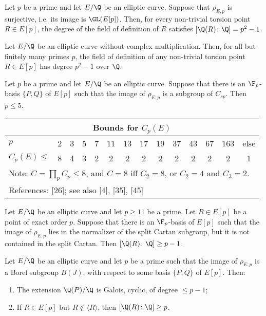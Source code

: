 \begin{thm} %
Let $p$ be a prime and let $E/\Q$ be an elliptic curve. Suppose that $\rho_{E,p}$ is surjective, i.e. its image is $\GL(E[p])$. Then, for every non-trivial torsion point $R \in E[p]$, the degree of the field of definition of $R$ satisfies $[\Q(R) \colon \Q]= p^2 - 1$. 
\end{thm}


\begin{cor} %
Let $E/\Q$ be an elliptic curve without complex multiplication. Then, for all but finitely many primes $p$, the field of definition of any non-trivial torsion point $R \in E[p]$ has degree $p^2 - 1$ over $\Q$. 
\end{cor}


\begin{thm} %
Let $p$ be a prime and let $E/\Q$ be an elliptic curve. Suppose that there is an $\F_p$-basis $\{ P, Q \}$ of $E[p]$ such that the image of $\rho_{E,p}$ is a subgroup of $C_{sp}$. Then $p \leq 5$.
\end{thm}


        \begin{table}[!ht]
        \centering
        \begin{tabular}{lccccccccccccc} \hline
        \multicolumn{14}{c}{Bounds for $C_p(E)$} \\ \hline
        $p$ & 2 & 3 & 5 & 7 & 11 & 13 & 17 & 19 & 37 & 43 & 67 & 163 & else \\ \hline
        $C_p(E) \leq$ & 8 & 4 & 3 & 2 & 2 & 2 & 2 & 2 & 2 & 2 & 2 & 2 & 1 \\ \hline
        \multicolumn{14}{l}{Note: $C= \prod_p C_p \leq 8$, and $C= 8$ iff $C_2= 8$, or $C_2= 4$ and $C_3= 2$.} \\ \hline
        \multicolumn{14}{l}{References: [26]; see also [4], [35], [45]} \\ \hline
        \end{tabular}
        \end{table}


\begin{thm} %
Let $E/\Q$ be an elliptic curve and let $p \geq 11$ be a prime. Let $R \in E[p]$ be a
point of exact order $p$. Suppose that there is an $\F_p$-basis of $E[p]$ such that the image of $\rho_{E,p}$ lies in the normalizer of the split Cartan subgroup, but it is not contained in the split Cartan. Then $[\Q(R) \colon \Q] \geq p - 1$.
\end{thm}


\begin{thm} %
Let $E/\Q$ be an elliptic curve and let $p$ be a prime such that the image of $\rho_{E,p}$ is a Borel subgroup $B(J)$, with respect to some basis $\{P,Q\}$ of $E[p]$. Then:
	\begin{enumerate}[(1)]
	\item The extension $\Q(P)/\Q$ is Galois, cyclic, of degree $\leq p -1$;
	\item If $R \in E[p]$ but $R \notin \langle R \rangle$, then $[\Q(R) \colon \Q] \geq p$.
	\end{enumerate}
\end{thm}


